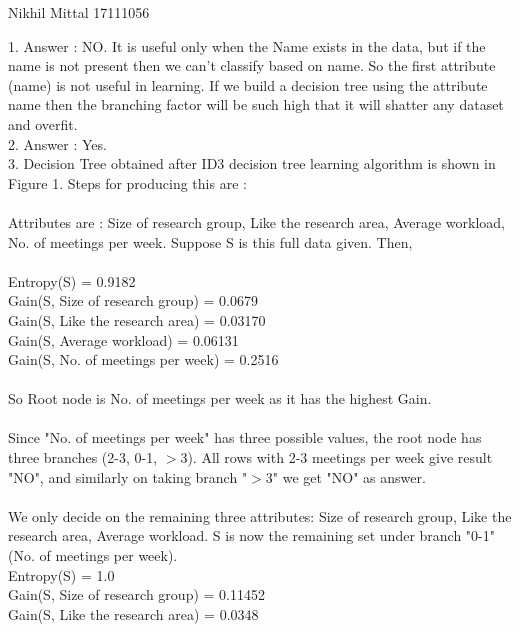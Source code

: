 \documentclass[a4paper,11pt]{article}
\begin{document}
								{Nikhil Mittal}      						           		%
								{17111056}																		%

\begin{mlsolution}

1. Answer : NO. It is useful only when the Name exists in the data, but if the name is not present then we can't classify based on name. So the first attribute (name) is not useful in learning.
If we build a decision tree using the attribute name then the branching factor will be such high that it will shatter any dataset and overfit.
\\

2. Answer : Yes.\\

3. Decision Tree obtained after ID3 decision tree learning algorithm is shown in Figure 1. Steps for producing this are :
\\\\Attributes are : Size of research group, Like the research area, Average workload, No. of meetings  per week. Suppose S is this full data given. Then, \\\\Entropy(S) = 0.9182\\
Gain(S, Size of research group) = 0.0679\\
Gain(S, Like the research area) = 0.03170\\
Gain(S, Average workload) = 0.06131\\
Gain(S, No. of meetings  per week) = 0.2516\\\\So Root node is No. of meetings per week as it has the highest Gain.\\\\Since "No. of meetings per week" has three possible values, the root node has three branches (2-3, 0-1, $>$3). All rows with 2-3 meetings per week give result "NO", and similarly on taking branch "$>$3" we get "NO" as answer. \\\\We only decide on the remaining three attributes: Size of research group, Like the research area, Average workload. S is now the remaining set under branch "0-1" (No. of meetings per week).\\
Entropy(S) = 1.0\\
Gain(S, Size of research group) = 0.11452\\
Gain(S, Like the research area) = 0.0348\\

\end{mlsolution}
\end{document}

